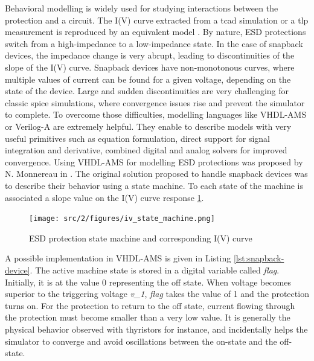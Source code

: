 Behavioral modelling is widely used for studying interactions between the protection and a circuit.
The I(V) curve extracted from a \gls{tcad} simulation or a \gls{tlp} measurement is reproduced by an equivalent model \cite{modelling-diode-esd, esd-diode-compact-model, tvs-modeling}.
By nature, ESD protections switch from a high-impedance to a low-impedance state.
In the case of snapback devices, the impedance change is very abrupt, leading to discontinuities of the slope of the I(V) curve.
Snapback devices have non-monotonous curves, where multiple values of current can be found for a given voltage, depending on the state of the device.
Large and sudden discontinuities are very challenging for classic \gls{spice} simulations, where convergence issues rise and prevent the simulator to complete.
To overcome those difficulties, modelling languages like VHDL-AMS or Verilog-A are extremely helpful.
They enable to describe models with very useful primitives such as equation formulation, direct support for signal integration and derivative, combined digital and analog solvers for improved convergence.
Using VHDL-AMS for modelling ESD protections was proposed by N. Monnereau in \cite{phd-monnereau}.
The original solution proposed to handle snapback devices was to describe their behavior using a state machine.
To each state of the machine is associated a slope value on the I(V) curve response \ref{fig:esd-protection-state-machine}.

\begin{figure}[!h]
  \centering
  \texttt{[image: src/2/figures/iv\_state\_machine.png]}
  \caption{ESD protection state machine and corresponding I(V) curve}
  \label{fig:esd-protection-state-machine}
\end{figure}

A possible implementation in VHDL-AMS is given in Listing \ref{lst:snapback-device}.
The active machine state is stored in a digital variable called \textit{flag}.
Initially, it is at the value 0 representing the off state.
When voltage becomes superior to the triggering voltage \textit{v\_1}, \textit{flag} takes the value of 1 and the protection turns on.
For the protection to return to the off state, current flowing through the protection must become smaller than a very low value.
It is generally the physical behavior observed with thyristors for instance, and incidentally helps the simulator to converge and avoid oscillations between the on-state and the off-state.

